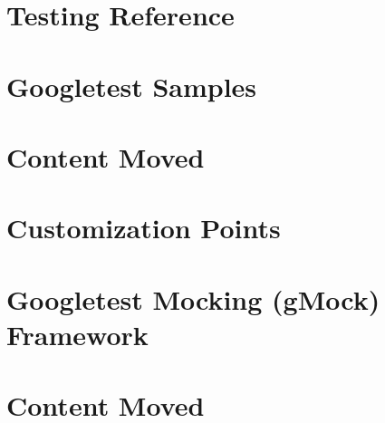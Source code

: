 \let\mypdfximage\pdfximage\def\pdfximage{\immediate\mypdfximage}\documentclass[twoside]{book}
\newcommand{\+}{\discretionary{\mbox{\scriptsize$\hookleftarrow$}}{}{}}
\begin{document}
\chapter{Testing Reference}
\label{md__home_omar_SEP25_build__deps_googletest_src_docs_reference_testing}

\chapter{Googletest Samples}
\label{md__home_omar_SEP25_build__deps_googletest_src_docs_samples}

\chapter{Content Moved}
\label{md__home_omar_SEP25_build__deps_googletest_src_googlemock_docs_README}

\chapter{Customization Points}
\label{md__home_omar_SEP25_build__deps_googletest_src_googlemock_include_gmock_internal_custom_README}

\chapter{Googletest Mocking (g\+Mock) Framework}
\label{md__home_omar_SEP25_build__deps_googletest_src_googlemock_README}

\chapter{Content Moved}
\label{md__home_omar_SEP25_build__deps_googletest_src_googletest_docs_README}

\end{document}
